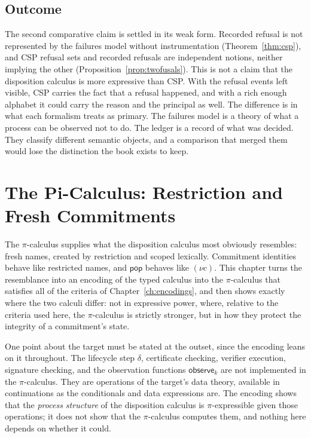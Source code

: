 \documentclass[11pt,openany]{book}
\theoremstyle{remark}
\begin{document}
\section{Outcome}

The second comparative claim is settled in its weak form. Recorded refusal
is not represented by the failures model without instrumentation
(Theorem~\ref{thm:csp}), and CSP refusal sets and recorded refusals are
independent notions, neither implying the other
(Proposition~\ref{prop:twofusals}). This is not a claim that the
disposition calculus is more expressive than CSP. With the refusal
events left visible, CSP carries the fact that a refusal happened, and
with a rich enough alphabet it could carry the reason and the principal
as well. The difference is in what each formalism treats as primary. The
failures model is a theory of what a process can be observed not to do.
The ledger is a record of what was decided. They classify different
semantic objects, and a comparison that merged them would lose the
distinction the book exists to keep.

\chapter{The Pi-Calculus: Restriction and Fresh Commitments}
\label{ch:pi}

The $\pi$-calculus supplies what the disposition calculus most obviously
resembles: fresh names, created by restriction and scoped lexically.
Commitment identities behave like restricted names, and $\mathsf{pop}$
behaves like $(\nu c)$. This chapter turns the resemblance into an
encoding of the typed calculus into the $\pi$-calculus that satisfies all
of the criteria of Chapter~\ref{ch:encodings}, and then shows exactly
where the two calculi differ: not in expressive power, where, relative
to the criteria used here, the $\pi$-calculus is strictly stronger, but in
how they protect the integrity of a commitment's state.

One point about the target must be stated at the outset, since the
encoding leans on it throughout. The lifecycle step $\delta$, certificate
checking, verifier execution, signature checking, and the observation
functions $\mathsf{observe}_k$ are not implemented in the $\pi$-calculus.
They are operations of the target's data theory, available in
continuations as the conditionals and data expressions are. The encoding
shows that the \emph{process structure} of the disposition calculus is
$\pi$-expressible given those operations; it does not show that the
$\pi$-calculus computes them, and nothing here depends on whether it
could.
\end{document}
